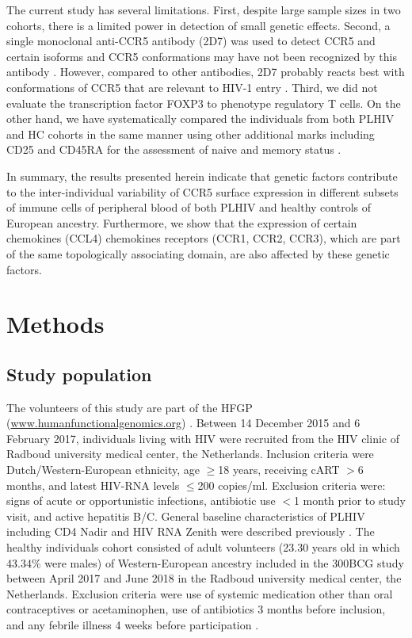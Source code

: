\documentclass{book}
\begin{document}
\begin{refsection}
The current study has several limitations.
First, despite large sample sizes in two cohorts, there is a limited power in detection of small genetic effects.
Second, a single monoclonal anti-CCR5 antibody (2D7) was used to detect CCR5 and certain isoforms and CCR5 conformations may have not been recognized by this antibody \cite{Lee1999Epitope}.
However, compared to other antibodies, 2D7 probably reacts best with conformations of CCR5 that are relevant to HIV-1 entry \cite{Colin2018CCR5}.
Third, we did not evaluate the transcription factor FOXP3 to phenotype regulatory T cells.
On the other hand, we have systematically compared the individuals from both PLHIV and HC cohorts in the same manner using other additional marks including CD25 and CD45RA for the assessment of naive and memory status \cite{Rosenblum2015Regulatory}.

In summary, the results presented herein indicate that genetic factors contribute to the inter-individual variability of CCR5 surface expression in different subsets of immune cells of peripheral blood of both PLHIV and healthy controls of European ancestry.
Furthermore, we show that the expression of certain chemokines (CCL4) chemokines receptors (CCR1, CCR2, CCR3), which are part of the same topologically associating domain, are also affected by these genetic factors.

\section*{Methods}
\subsection*{Study population}
The volunteers of this study are part of the HFGP (\url{www.humanfunctionalgenomics.org}) \cite{Netea2016Understanding}.
Between 14 December 2015 and 6 February 2017, individuals living with HIV were recruited from the HIV clinic of Radboud university medical center, the Netherlands.
Inclusion criteria were Dutch/Western-European ethnicity, age $\geq$18 years, receiving cART $>$6 months, and latest HIV-RNA levels $\leq$200 copies/ml.
Exclusion criteria were: signs of acute or opportunistic infections, antibiotic use $<$1 month prior to study visit, and active hepatitis B/C.
General baseline characteristics of PLHIV including CD4 Nadir and HIV RNA Zenith were described previously \cite{Van2021The}.
The healthy individuals cohort consisted of adult volunteers (23.30 years old in which 43.34\% were males) of Western-European ancestry included in the 300BCG study between April 2017 and June 2018 in the Radboud university medical center, the Netherlands.
Exclusion criteria were use of systemic medication other than oral contraceptives or acetaminophen, use of antibiotics 3 months before inclusion, and any febrile illness 4 weeks before participation \cite{Koeken2020BCG}.


\end{refsection}
\end{document}

